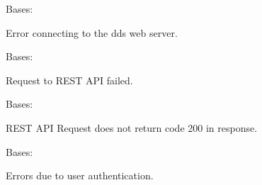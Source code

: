 \documentclass[letterpaper,10pt,english]{sphinxmanual}
\begin{document}
\begin{fulllineitems}
\label{\detokenize{dds_cli:dds_cli.exceptions.APIError}}
\sphinxAtStartPar
Bases: 

\sphinxAtStartPar
Error connecting to the dds web server.

\end{fulllineitems}


\begin{fulllineitems}
\label{\detokenize{dds_cli:dds_cli.exceptions.ApiRequestError}}
\sphinxAtStartPar
Bases: 

\sphinxAtStartPar
Request to REST API failed.

\end{fulllineitems}


\begin{fulllineitems}
\label{\detokenize{dds_cli:dds_cli.exceptions.ApiResponseError}}
\sphinxAtStartPar
Bases: 

\sphinxAtStartPar
REST API Request does not return code 200 in response.

\end{fulllineitems}


\begin{fulllineitems}
\label{\detokenize{dds_cli:dds_cli.exceptions.AuthenticationError}}
\sphinxAtStartPar
Bases: 

\sphinxAtStartPar
Errors due to user authentication.

\end{fulllineitems}
\end{document}
